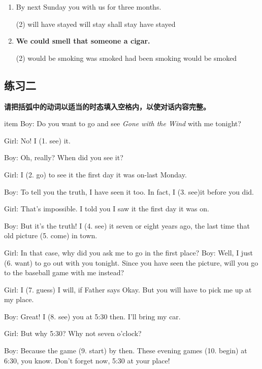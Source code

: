 \begin{enumerate}
\item By next Sunday you \ttu with us for three months.
  \begin{tasks}(2)
    \task will have stayed
    \task will stay
    \task shall stay
    \task have stayed
  \end{tasks}


\item \textbf{We could smell that someone \ttu a cigar.}
  \begin{tasks}(2)
    \task would be smoking
    \task was smoked
    \task had been smoking
    \task would be smoked
  \end{tasks}

\end{enumerate}

\subsection{练习二}

\textbf{请把括弧中的动词以适当的时态填入空格内，以使对话内容完整。}

item Boy: Do you want to go and see \textit{Gone with the Wind} with me tonight?

Girl: No! I \ttu (1. see) it.

Boy: Oh, really? When did you see it?

Girl: I \ttu (2. go) to see it the first day it was on-last Monday.

Boy: To tell you the truth, I have seen it too. In fact, I \ttu (3. see)it before you did.

Girl: That's impossible. I told you I saw it the first day it was on.

Boy: But it's the truth! I \ttu (4. see) it seven or eight years ago, the
last time that old picture \ttu (5. come) in town.


Girl: In that case, why did you ask me to go in the first place? Boy: Well,
I just \ttu (6. want) to go out with you tonight. Since you have seen the
picture, will you go to the baseball game with me instead?

Girl: I \ttu (7. guess) I will, if Father says Okay. But you will have to
pick me up at my place.

Boy: Great! I \ttu (8. see) you at 5:30 then. I'll bring my car.

Girl: But why 5:30? Why not seven o'clock?

Boy: Because the game \ttu (9. start) by then. These evening games \ttu (10.
begin) at 6:30, you know. Don't forget now, 5:30 at your place!

